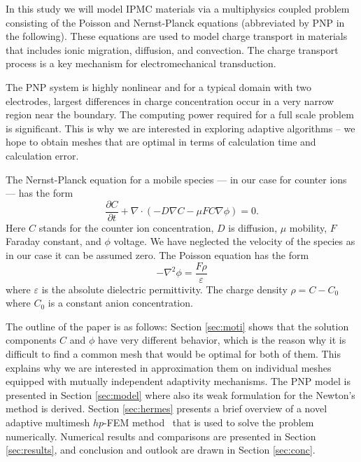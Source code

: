 In this study we will model IPMC materials via a multiphysics coupled problem 
consisting of the Poisson and Nernst-Planck equations (abbreviated by PNP in
the following). These equations are used to model charge transport in materials 
that includes ionic migration, diffusion, and convection. The charge transport 
process is a key mechanism for electromechanical transduction.

The PNP system is highly nonlinear and for a typical domain with two
electrodes, largest differences in charge concentration occur in a very narrow
region near the boundary. The computing power required for a full scale problem 
is significant. This is why we are interested in exploring adaptive algorithms
-- we hope to obtain meshes that are optimal in terms of calculation time and 
calculation error.

The Nernst-Planck equation for a mobile species ---
in our case for counter ions --- has the form
\begin{equation}
  \frac{\partial C}{\partial t}+\nabla\cdot(-D\nabla C-\mu FC\nabla\phi)=0.
  \label{eq:nernst-planck}
\end{equation}
Here $C$ stands for the counter ion concentration, $D$ is diffusion, $\mu$ mobility,
$F$ Faraday constant, and $\phi$ voltage. We have neglected 
the velocity of the species as in our case it can be assumed zero. 
The Poisson equation has the form
\begin{equation}
  -\nabla^2\phi=\frac{F\rho}{\varepsilon}
  \label{eq:poisson}
\end{equation}
where $\varepsilon$ is the absolute dielectric permittivity. The
charge density $\rho = C-C_{0}$ 
where $C_{0}$ is a constant anion concentration.

The outline of the paper is as follows: Section \ref{sec:moti} shows that 
the solution components $C$ and $\phi$ have very different behavior, which
is the reason why it is difficult to find a common mesh that would be optimal 
for both of them. This explains why we are interested in approximation them
on individual meshes equipped with mutually independent adaptivity 
mechanisms. The PNP model is presented in Section \ref{sec:model} where also its weak 
formulation for the Newton's method is derived. Section \ref{sec:hermes}
presents a brief overview of a novel adaptive multimesh $hp$-FEM 
method~\cite{solin2010monolithic,solin2010adaptive,dubcova2010space,solini2010adaptive}
that is used to solve the 
problem numerically. Numerical results and comparisons are presented in Section 
\ref{sec:results}, and conclusion and outlook are drawn in Section \ref{sec:conc}.


